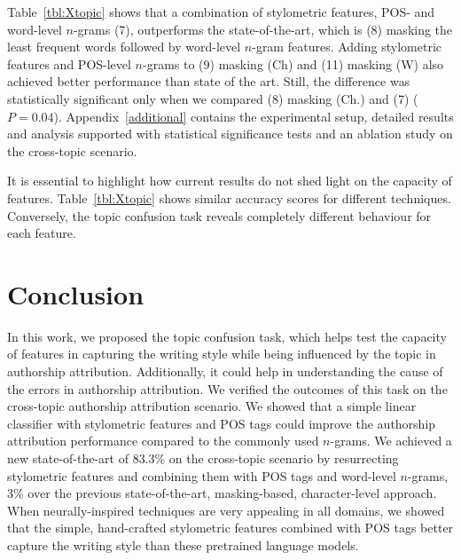 \documentclass[11pt]{article}
\begin{document}
Table~\ref{tbl:Xtopic} shows that a combination of stylometric features, POS- and word-level $n$-grams (7), outperforms the state-of-the-art, which is (8) masking the least frequent words followed by word-level $n$-gram features. Adding stylometric features and POS-level $n$-grams to (9) masking (Ch) and (11) masking (W) also achieved better performance than state of the art. Still, the difference was statistically significant only when we compared (8) masking (Ch.) and (7) ($P=0.04$). Appendix~\ref{additional} contains the experimental setup, detailed results and analysis supported with statistical significance tests and an ablation study on the cross-topic scenario.

It is essential to highlight how current results do not shed light on the capacity of features. Table~\ref{tbl:Xtopic} shows similar accuracy scores for different techniques. Conversely, the topic confusion task reveals completely different behaviour for each feature. 

\section{Conclusion}
In this work, we proposed the topic confusion task, which helps test the capacity of features in capturing the writing style while being influenced by the topic in authorship attribution. Additionally, it could help in understanding the cause of the errors in authorship attribution. We verified the outcomes of this task on the cross-topic authorship attribution scenario. We showed that a simple linear classifier with stylometric features and POS tags could improve the authorship attribution performance compared to the commonly used $n$-grams. We achieved a new state-of-the-art of 83.3\% on the cross-topic scenario by resurrecting stylometric features and combining them with POS tags and word-level $n$-grams, 3\% over the previous state-of-the-art, masking-based, character-level approach. When neurally-inspired techniques are very appealing in all domains, we showed that the simple, hand-crafted stylometric features combined with POS tags better capture the writing style than these pretrained language models. 

\end{document}
